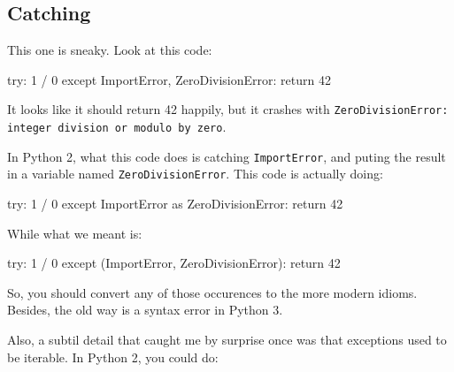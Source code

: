\subsection{Catching}

This one is sneaky. Look at this code:

\begin{py2}
try:
    1 / 0
except ImportError, ZeroDivisionError:
    return 42
\end{py2}

It looks like it should return 42 happily, but it crashes with \lstinline{ZeroDivisionError: integer division or modulo by zero}.

In Python 2, what this code does is catching \lstinline{ImportError}, and puting the result in a variable named \lstinline{ZeroDivisionError}. This code is actually doing:

\begin{py2}
try:
    1 / 0
except ImportError as ZeroDivisionError:
    return 42
\end{py2}

While what we meant is:

\begin{py2}
try:
    1 / 0
except (ImportError, ZeroDivisionError):
    return 42
\end{py2}

So, you should convert any of those occurences to the more modern idioms. Besides, the old way is a syntax error in Python 3.

Also, a subtil detail that caught me by surprise once was that exceptions used to be \gls{iterable}. In Python 2, you could do:

